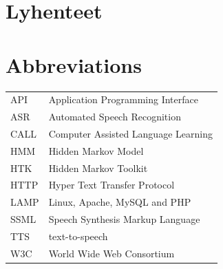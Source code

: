 \documentclass[11pt,a4paper,oneside,article]{memoir}
\begin{document}

\pagestyle{empty} %
\tableofcontents*
\pagestyle{empty} %
\clearpage
\pagestyle{plain}




\pagestyle{empty}
\setlength{\parskip}{1cm}
 {
  \chapter*{Lyhenteet}
} {
  \chapter*{Abbreviations}
}
\begin{table}[h]
\setlength{\tabcolsep}{8pt}
\renewcommand{\arraystretch}{2}
\begin{tabular}{l p{12cm}}

API & Application Programming Interface\\
ASR & Automated Speech Recognition\\
CALL & Computer Assisted Language Learning\\
HMM & Hidden Markov Model\\
HTK & Hidden Markov Toolkit\\
HTTP & Hyper Text Transfer Protocol \\
LAMP & Linux, Apache, MySQL and PHP \\
SSML & Speech Synthesis Markup Language\\
TTS & text-to-speech\\
W3C & World Wide Web Consortium \\

\end{tabular}
\end{table}

\newpage
\end{document}
